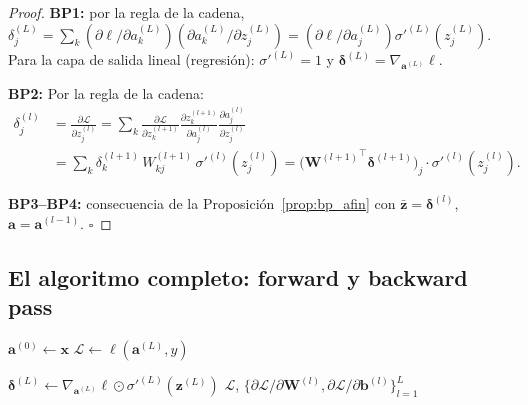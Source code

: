 \begin{proof}
\textbf{BP1:} por la regla de la cadena,
$\delta_j^{(L)} = \sum_k (\partial\ell/\partial a_k^{(L)})
(\partial a_k^{(L)}/\partial z_j^{(L)}) =
(\partial\ell/\partial a_j^{(L)})\sigma'^{(L)}(z_j^{(L)})$.
Para la capa de salida lineal (regresión):
$\sigma'^{(L)} = 1$ y $\bm{\delta}^{(L)} = \nabla_{\bm{a}^{(L)}}\ell$.

\textbf{BP2:} Por la regla de la cadena:
\begin{align*}
  \delta_j^{(l)}
  &= \frac{\partial\mathcal{L}}{\partial z_j^{(l)}}
  = \sum_k \frac{\partial\mathcal{L}}{\partial z_k^{(l+1)}}
  \frac{\partial z_k^{(l+1)}}{\partial a_j^{(l)}}
  \frac{\partial a_j^{(l)}}{\partial z_j^{(l)}} \\
  &= \sum_k \delta_k^{(l+1)}\, W_{kj}^{(l+1)}\,
  \sigma'^{(l)}(z_j^{(l)})
  = \bigl({\bm{W}^{(l+1)}}^\top\bm{\delta}^{(l+1)}\bigr)_j
  \cdot \sigma'^{(l)}(z_j^{(l)}).
\end{align*}

\textbf{BP3–BP4:} consecuencia de la
Proposición~\ref{prop:bp_afin} con $\bar{\bm{z}} = \bm{\delta}^{(l)}$,
$\bm{a} = \bm{a}^{(l-1)}$. $\square$
\end{proof}

\subsection{El algoritmo completo: forward y backward pass}
\label{subsec:alg_completo}

\begin{algorithm}[H]
\caption{Forward y backward pass del MLP}
\label{alg:backprop}

$\bm{a}^{(0)} \leftarrow \bm{x}$\;
$\mathcal{L} \leftarrow \ell(\bm{a}^{(L)}, y)$\;

$\bm{\delta}^{(L)} \leftarrow \nabla_{\bm{a}^{(L)}}\ell
\odot \sigma'^{(L)}(\bm{z}^{(L)})$ 
\Return $\mathcal{L}$,
  $\{\partial\mathcal{L}/\partial\bm{W}^{(l)},
  \partial\mathcal{L}/\partial\bm{b}^{(l)}\}_{l=1}^L$\;
\end{algorithm}

